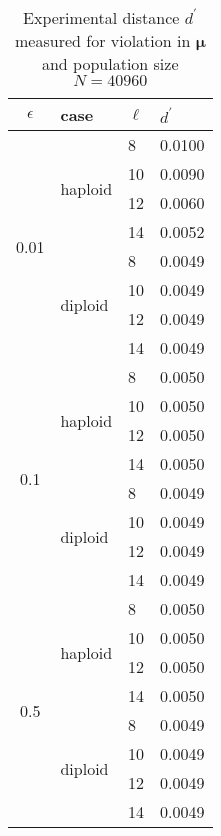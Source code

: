 \begin{table}[ht]
\caption{Experimental distance $d^\prime$ measured for violation in $\bm{\mu}$ and population size $N = 40960$ }
\centering
\begin{tabularx}{0.75\textwidth}{ c *{3}{X}}
\toprule
$\epsilon$ & case & $\ell$ & $d^\prime$ \\
\midrule
\multirow{8}{*}{0.01} & \multirow{4}{*}{haploid} 	& 8 & 0.0100 \\
		      &   				& 10 & 0.0090 \\ 
		      & 			 	& 12 & 0.0060 \\
		      &  	 			& 14 & 0.0052 \\ 
		      \cmidrule(l){2-4}
		      & \multirow{4}{*}{diploid} 	& 8 & 0.0049 \\
		      &  	 			& 10 & 0.0049 \\
		      & 			 	& 12 & 0.0049 \\
		      &  	 			& 14 & 0.0049 \\
		      \midrule
\multirow{8}{*}{0.1} & \multirow{4}{*}{haploid} 	& 8 & 0.0050 \\
		      &   				& 10 & 0.0050 \\	
		      & 				& 12 & 0.0050 \\	
		      &  	 			& 14 & 0.0050 \\
		      \cmidrule(l){2-4}
		      & \multirow{4}{*}{diploid} 	& 8 & 0.0049 \\
		      &  	 			& 10 & 0.0049 \\
		      & 				& 12 & 0.0049 \\
		      &  	 			& 14 & 0.0049 \\
		      \midrule
\multirow{8}{*}{0.5} & \multirow{4}{*}{haploid} 	& 8 & 0.0050 \\
		      &   				& 10 & 0.0050 \\
		      & 				& 12 & 0.0050 \\
		      &  	 			& 14 & 0.0050 \\
		      \cmidrule(l){2-4}
		      & \multirow{4}{*}{diploid} 	& 8 & 0.0049 \\	
		      &  	 			& 10 & 0.0049 \\
		      &  				& 12 & 0.0049 \\
		      &  	 			& 14 & 0.0049 \\
\bottomrule
\end{tabularx}
\label{ditanceMu40960}
\end{table} 



